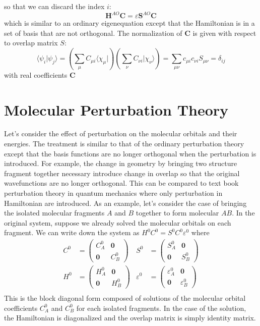 \documentclass{article}
\newcommand{\statebra}[1]{\langle #1 |}
\newcommand{\stateket}[1]{| #1 \rangle}
\begin{document}
so that we can discard the index $i$:
\begin{equation}
    \textbf{H}^{AO} \mathbf{C} = \varepsilon \mathbf{S}^{AO} \mathbf{C}
\end{equation}
which is similar to an ordinary eigenequation except that the Hamiltonian 
is in a set of basis that are not orthogonal. The normalization of $\mathbf{C}$
is given with respect to overlap matrix $S$:
\begin{equation}
    \statebra{ \psi_i } \psi_j \rangle = \left( \sum_{\mu} C_{\mu i} \statebra{\chi_{\mu}} \right)  \left( \sum_{\nu} C_{\nu i} \stateket{\chi_{\nu}} \right) = \sum_{\mu\nu} c_{\mu i} c_{\nu i} S_{\mu \nu} = \delta_{ij}
\end{equation}
with real coefficients $\mathbf{C}$


\section{Molecular Perturbation Theory}
Let's consider the effect of perturbation on the molecular orbitals and their energies. The 
treatment is similar to that of the ordinary perturbation theory except that the basis functions 
are no longer orthogonal when the perturbation is introduced. For example, the change in geometry
by bringing two structure fragment together necessary introduce change in overlap so that the 
original wavefunctions are no longer orthogonal. This can be compared to text book perturbation
theory in quantum mechanics where only perturbation in Hamiltonian are introduced. As an example, 
let's consider the case of bringing the isolated molecular fragments $A$ and $B$ together to 
form molecular $AB$. In the original system, suppose we already solved the molecular orbitals on
each fragment. We can write down the system as
$H^0 C^0 = S^0 C^0 \varepsilon^0$ where
\begin{align}
    C^0 &= \left( \begin{matrix} C_A^0 & \mathbf{0} \\ \mathbf{0} & C_B^0 \end{matrix} \right) &
    S^0 &= \left( \begin{matrix} S_A^0 & \mathbf{0} \\ \mathbf{0} & S_B^0 \end{matrix} \right) \\
    H^0 &= \left( \begin{matrix} H_A^0 & \mathbf{0} \\ \mathbf{0} & H_B^0 \end{matrix} \right) &
    \varepsilon^0 &= \left( \begin{matrix} \varepsilon_A^0 & \mathbf{0} \\ \mathbf{0} & \varepsilon_B^0 \end{matrix} \right) \\
\end{align}
This is the block diagonal form composed of solutions of the molecular orbital coefficients $C_A^0$ and $C_B^0$
for each isolated fragments. In the case of the solution, the Hamiltonian is diagonalized and 
the overlap matrix is simply identity matrix. 
\end{document}
